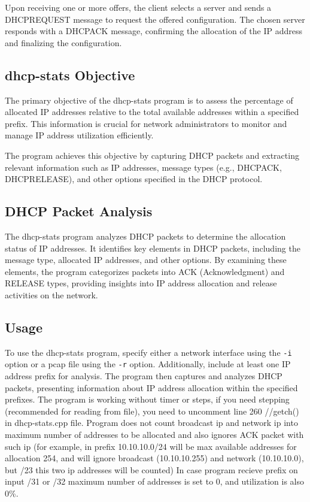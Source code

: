 \documentclass[a4paper]{article}
\begin{document}
Upon receiving one or more offers, the client selects a server and sends a DHCPREQUEST message to request the offered configuration. The chosen server responds with a DHCPACK message, confirming the allocation of the IP address and finalizing the configuration.

\subsection{dhcp-stats Objective}

The primary objective of the dhcp-stats program is to assess the percentage of allocated IP addresses relative to the total available addresses within a specified prefix. This information is crucial for network administrators to monitor and manage IP address utilization efficiently.

The program achieves this objective by capturing DHCP packets and extracting relevant information such as IP addresses, message types (e.g., DHCPACK, DHCPRELEASE), and other options specified in the DHCP protocol.

\subsection{DHCP Packet Analysis}

The dhcp-stats program analyzes DHCP packets to determine the allocation status of IP addresses. It identifies key elements in DHCP packets, including the message type, allocated IP addresses, and other options. By examining these elements, the program categorizes packets into ACK (Acknowledgment) and RELEASE types, providing insights into IP address allocation and release activities on the network.

\subsection{Usage}

To use the dhcp-stats program, specify either a network interface using the \texttt{-i} option or a pcap file using the \texttt{-r} option. Additionally, include at least one IP address prefix for analysis. The program then captures and analyzes DHCP packets, presenting information about IP address allocation within the specified prefixes.
\newline The program is working without timer or steps, if you need stepping (recommended for reading from file), you need to uncomment line 260 //getch() in dhcp-stats.cpp file.
Program does not count broadcast ip and network ip into maximum number of addresses to be allocated and also ignores ACK packet with such ip (for example, in prefix 10.10.10.0/24 will be max available addresses for allocation 254, and will ignore broadcast (10.10.10.255) and network (10.10.10.0), but /23 this two ip addresses will be counted)
In case program recieve prefix on input /31 or /32 maximum number of addresses is set to 0, and utilization is also 0\%.
\end{document}
